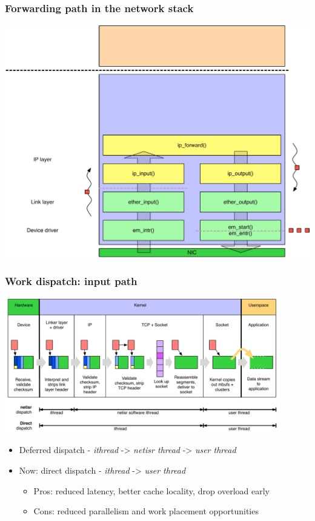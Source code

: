 \begin{frame}
  \frametitle{Forwarding path in the network stack}
  \begin{center}
    \includegraphics[scale=0.4]{../../figures/network-forward.pdf}
  \end{center}
\end{frame}

\begin{frame}
  \frametitle{Work dispatch: input path}

  \begin{center}
    \includegraphics[width=0.9\textwidth]{../../figures/network-dispatch-input.pdf}
  \end{center}

  \begin{small}
  \begin{itemize}
    \item Deferred dispatch - \textit{ithread} -> \textit{netisr thread} ->
      \textit{user thread}
    \item Now: direct dispatch - \textit{ithread} -> \textit{user thread}
    \begin{itemize}
      \item Pros: reduced latency, better cache locality, drop overload early
      \item Cons: reduced parallelism and work placement opportunities
    \end{itemize}
  \end{itemize}
  \end{small}
\end{frame}

